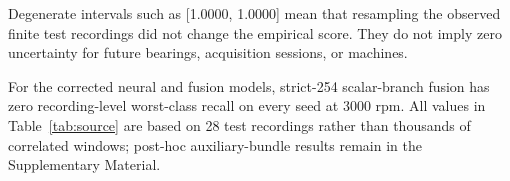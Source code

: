 \documentclass[machines,article,submit,oneauthor]{Definitions/mdpi}
\begin{document}
\begin{table}[H]
\centering
\caption{Classical source-recording evaluation. Intervals are class-stratified 95\% empirical recording-resampling intervals over 2,000 replicates, conditional on the fitted model and observed test recordings. Majority vote is reported as a sensitivity aggregation.}
\label{tab:classical-source}
\small
{}
\end{table}

Degenerate intervals such as [1.0000, 1.0000] mean that resampling the observed finite test recordings did not change the empirical score. They do not imply zero uncertainty for future bearings, acquisition sessions, or machines.

For the corrected neural and fusion models, strict-254 scalar-branch fusion has zero recording-level worst-class recall on every seed at 3000 rpm. All values in Table~\ref{tab:source} are based on 28 test recordings rather than thousands of correlated windows; post-hoc auxiliary-bundle results remain in the Supplementary Material.
\end{document}
